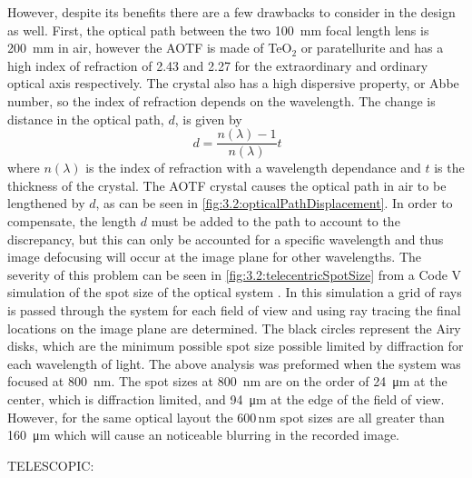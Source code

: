 \documentclass[12pt, draft]{article}
\begin{document}
However, despite its benefits there are a few drawbacks to consider in the design as well. First, the optical path between the two 100~mm focal length lens is 200~mm in air, however the AOTF is made of TeO$_{2}$  or paratellurite and has a high index of refraction of 2.43 and 2.27 for the extraordinary and ordinary optical axis respectively. The crystal also has a high dispersive property, or Abbe number, so the index of refraction depends on the wavelength. The change is distance in the optical path, $d$, is given by
\begin{equation}
    \ d = \frac{n(\lambda)-1}{n(\lambda)}t
    \label{eqn:3.2:opticalPathDisplacement}
\end{equation}
where $n(\lambda)$ is the index of refraction with a wavelength dependance and $t$ is the thickness of the crystal. The AOTF crystal causes the optical path in air to be lengthened by $d$, as can be seen in \autoref{fig:3.2:opticalPathDisplacement}. In order to compensate, the length $d$ must be added to the path to account to the discrepancy, but this can only be accounted for a specific wavelength and thus image defocusing will occur at the image plane for other wavelengths. The severity of this problem can be seen in \autoref{fig:3.2:telecentricSpotSize} from a Code V simulation of the spot size of the optical system . In this simulation a grid of rays is passed through the system for each field of view and using ray tracing the final locations on the image plane are determined. The black circles represent the Airy disks, which are the minimum possible spot size possible limited by diffraction for each wavelength of light. The above analysis was preformed when the system was focused at 800~nm. The spot sizes at 800~nm are on the order of 24~\si{\micro\meter} at the center, which is diffraction limited, and 94~\si{\micro\meter} at the edge of the field of view. However, for the same optical layout the 600\,nm spot sizes are all greater than 160~\si{\micro\meter} which will cause an noticeable blurring in the recorded image.

TELESCOPIC:
\end{document}
